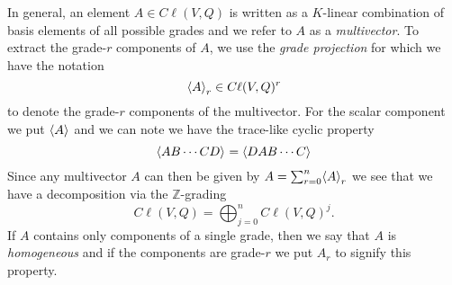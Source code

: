 In general, an element $A \in C\ell(V,Q)$ is written as a $K$-linear combination of basis elements of all possible grades and we refer to $A$ as a \emph{multivector}.  To extract the grade-$r$ components of $A$, we use the \emph{grade projection} for which we have the notation
\begin{equation}
\proj{r}{A} \in C\ell(V,Q)^r
\end{equation}
to denote the grade-$r$ components of the multivector. For the scalar component we put $\proj{}{A}$ and we can note we have the trace-like cyclic property
\begin{equation}
\label{eq:cyclic_property}
\proj{}{AB\cdots CD} = \proj{}{DAB\cdots C}
\end{equation} 
Since any multivector $A$ can then be given by $A = \sum_{r=0}^n \proj{r}{A}$ we see that we have a decomposition via the $\mathbb{Z}$-grading
\begin{equation}
C\ell(V,Q) = \bigoplus_{j=0}^n C\ell(V,Q)^j.
\end{equation}
If $A$ contains only components of a single grade, then we say that $A$ is \emph{homogeneous} and if the components are grade-$r$ we put $A_r$ to signify this property. 

